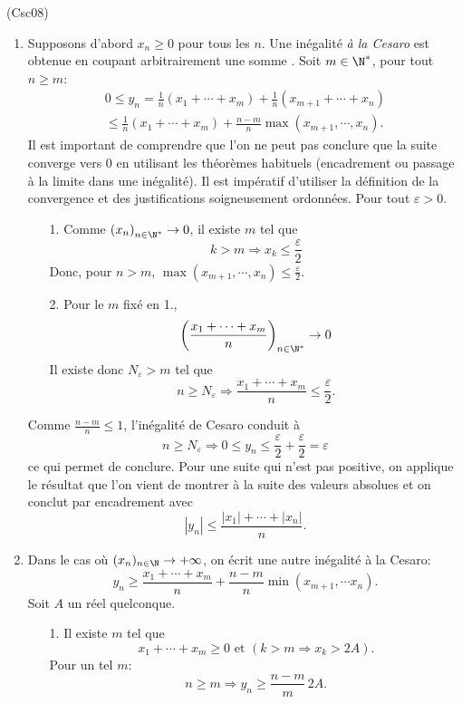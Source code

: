 \begin{tiny}(Csc08)\end{tiny}
\begin{enumerate}
 \item Supposons d'abord $x_n \geq0$ pour tous les $n$.\newline
 Une inégalité \emph{à la Cesaro} est obtenue en coupant arbitrairement une somme .\newline
 Soit $m \in \N^*$, pour tout $n\geq m$:
\begin{multline*}
 0 \leq y_n = \frac{1}{n}(x_1 + \cdots +x_m) + \frac{1}{n}(x_{m+1} + \cdots + x_n) \\
 \leq \frac{1}{n}(x_1 + \cdots +x_m) + \frac{n-m}{n}\max(x_{m+1}, \cdots, x_n).
\end{multline*}
Il est important de comprendre que l'on ne peut pas conclure que la suite converge vers 0 en utilisant les théorèmes habituels (encadrement ou passage à la limite dans une inégalité). Il est impératif d'utiliser la définition de la convergence et des justifications soigneusement ordonnées.\newline
Pour tout $\varepsilon >0$.
\begin{itemize}
 \item [1.] Comme $\left( x_n \right)_{n \in \N^*} \rightarrow 0$, il existe $m$ tel que 
 \[
  k > m \Rightarrow x_k \leq \frac{\varepsilon}{2}
 \]
Donc, pour $n >m$, $\max(x_{m+1}, \cdots, x_n)\leq \frac{\varepsilon}{2}$.
 \item [2.] Pour le $m$ fixé en 1.,  
\[
 \left( \frac{x_1 + \cdots + x_m}{n} \right)_{n \in \N^*} \rightarrow 0
\]
Il existe donc $N_\varepsilon > m$ tel que
\[
 n \geq N_\varepsilon \Rightarrow
 \frac{x_1 + \cdots + x_m}{n} \leq \frac{\varepsilon}{2}.
\]
\end{itemize}
Comme $\frac{n-m}{n}\leq 1$, l'inégalité de Cesaro conduit à 
\[
 n \geq N_{\varepsilon} \Rightarrow 0 \leq y_n \leq \frac{\varepsilon}{2} + \frac{\varepsilon}{2} = \varepsilon
\]
ce qui permet de conclure.\newline
Pour une suite qui n'est pas positive, on applique le résultat que l'on vient de montrer à la suite des valeurs absolues et on conclut par encadrement avec
\[
 |y_n| \leq \frac{|x_1| + \cdots + |x_n|}{n}.
\]

 \item Dans le cas où $(x_n)_{n\in \N} \rightarrow + \infty$, on écrit une autre inégalité à la Cesaro:
\[
 y_n \geq \frac{x_1 + \cdots + x_m}{n} + \frac{n-m}{n}\min(x_{m+1}, \cdots x_n).
\]
Soit $A$ un réel quelconque.
\begin{itemize}
 \item [1.] Il existe $m$ tel que 
\[
  x_1 + \cdots + x_m \geq 0 \text{ et }  \left(k >m \Rightarrow x_k > 2A\right).
\]
Pour un tel $m$:
\[
  n \geq m \Rightarrow y_n \geq \frac{n-m}{m}\,2A.
\]


\end{itemize}
\end{enumerate}
